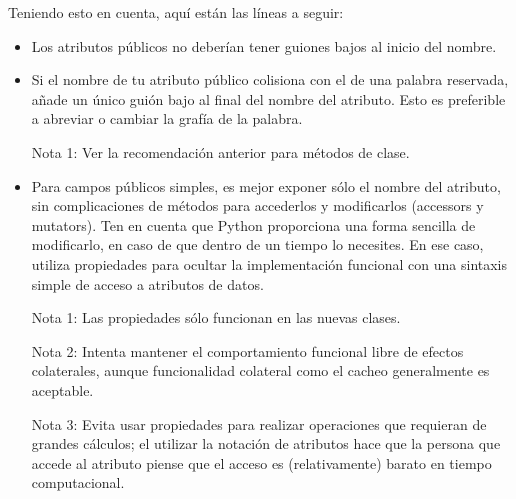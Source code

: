 \documentclass[a4paper,11pt,oneside]{book}
\begin{document}
Teniendo esto en cuenta, aquí están las líneas a seguir:
\begin{itemize}
\item Los atributos públicos no deberían tener guiones bajos al inicio del nombre.
\item Si el nombre de tu atributo público colisiona con el de una palabra reservada, añade un único guión bajo al final del nombre del atributo. Esto es preferible a abreviar o cambiar la grafía de la palabra.

Nota 1: Ver la recomendación anterior para métodos de clase.
\item Para campos públicos simples, es mejor exponer sólo el nombre del atributo, sin complicaciones de métodos para accederlos y modificarlos (accessors y mutators). Ten en cuenta que Python proporciona una forma sencilla de modificarlo, en caso de que dentro de un tiempo lo necesites. En ese caso, utiliza propiedades para ocultar la implementación funcional con una sintaxis simple de acceso a atributos de datos.

Nota 1: Las propiedades sólo funcionan en las nuevas clases.

Nota 2: Intenta mantener el comportamiento funcional libre de efectos colaterales, aunque funcionalidad colateral como el cacheo generalmente es aceptable.

Nota 3: Evita usar propiedades para realizar operaciones que requieran de grandes cálculos; el utilizar la notación de atributos hace que la persona que accede al atributo piense que el acceso es (relativamente) barato en tiempo computacional.
\end{itemize}
\end{document}
